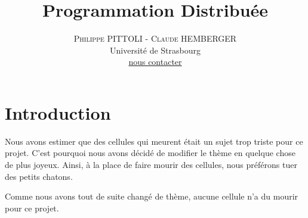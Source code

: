 \documentclass[twoside]{article}
\title{\vspace{-15mm}\fontsize{24pt}{10pt}\selectfont\textbf{Programmation Distribuée}}
\author{
\large
\textsc{Philippe PITTOLI - Claude HEMBERGER}\\[2mm]
\normalsize Université de Strasbourg \\ 
\normalsize \href{mailto:philippe.pittoli@etu.unistra.fr}{nous contacter}
\vspace{-5mm}
}
\date{}
\begin{document}
\maketitle %

\thispagestyle{fancy} %



\section{Introduction}
Nous avons estimer que des cellules qui meurent était un sujet trop triste pour ce projet.
C'est pourquoi nous avons décidé de modifier le thème en quelque chose de plus joyeux.
Ainsi, à la place de faire mourir des cellules, nous préférons tuer des petits chatons.

Comme nous avons tout de suite changé de thème, aucune cellule n'a du mourir pour ce projet.
\end{document}
